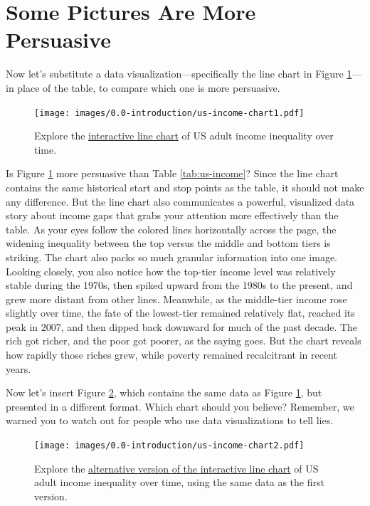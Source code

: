 \documentclass[
  english,
]{book}
\begin{document}
\hypertarget{persuasive}{%
\section*{Some Pictures Are More Persuasive}\label{persuasive}}

Now let's substitute a data visualization---specifically the line chart in Figure \ref{fig:us-income-chart1}---in place of the table, to compare which one is more persuasive.



\begin{figure}
\centering
\texttt{[image: images/0.0-introduction/us-income-chart1.pdf]}
\caption{\label{fig:us-income-chart1}Explore the \href{https://datawrapper.dwcdn.net/LtRbj/}{interactive line chart} of US adult income inequality over time.}
\end{figure}

Is Figure \ref{fig:us-income-chart1} more persuasive than Table \ref{tab:us-income}? Since the line chart contains the same historical start and stop points as the table, it should not make any difference. But the line chart also communicates a powerful, visualized data story about income gaps that grabs your attention more effectively than the table. As your eyes follow the colored lines horizontally across the page, the widening inequality between the top versus the middle and bottom tiers is striking. The chart also packs so much granular information into one image. Looking closely, you also notice how the top-tier income level was relatively stable during the 1970s, then spiked upward from the 1980s to the present, and grew more distant from other lines. Meanwhile, as the middle-tier income rose slightly over time, the fate of the lowest-tier remained relatively flat, reached its peak in 2007, and then dipped back downward for much of the past decade. The rich got richer, and the poor got poorer, as the saying goes. But the chart reveals how rapidly those riches grew, while poverty remained recalcitrant in recent years.

Now let's insert Figure \ref{fig:us-income-chart2}, which contains the same data as Figure \ref{fig:us-income-chart1}, but presented in a different format. Which chart should you believe? Remember, we warned you to watch out for people who use data visualizations to tell lies.



\begin{figure}
\centering
\texttt{[image: images/0.0-introduction/us-income-chart2.pdf]}
\caption{\label{fig:us-income-chart2}Explore the \href{https://datawrapper.dwcdn.net/JsxEp/}{alternative version of the interactive line chart} of US adult income inequality over time, using the same data as the first version.}
\end{figure}
\end{document}
